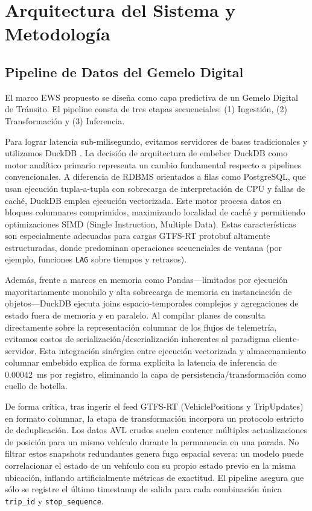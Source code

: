 \documentclass[journal,twocolumn]{IEEEtran}
\begin{document}
\section{Arquitectura del Sistema y Metodología}

\subsection{Pipeline de Datos del Gemelo Digital}
El marco EWS propuesto se diseña como capa predictiva de un Gemelo Digital de Tránsito. El pipeline consta de tres etapas secuenciales: (1) Ingestión, (2) Transformación y (3) Inferencia.

Para lograr latencia sub-milisegundo, evitamos servidores de bases tradicionales y utilizamos DuckDB \cite{14}. La decisión de arquitectura de embeber DuckDB como motor analítico primario representa un cambio fundamental respecto a pipelines convencionales. A diferencia de RDBMS orientados a filas como PostgreSQL, que usan ejecución tupla-a-tupla con sobrecarga de interpretación de CPU y fallas de caché, DuckDB emplea ejecución vectorizada. Este motor procesa datos en bloques columnares comprimidos, maximizando localidad de caché y permitiendo optimizaciones SIMD (Single Instruction, Multiple Data). Estas características son especialmente adecuadas para cargas GTFS-RT protobuf altamente estructuradas, donde predominan operaciones secuenciales de ventana (por ejemplo, funciones \texttt{LAG} sobre tiempos y retrasos).

Además, frente a marcos en memoria como Pandas---limitados por ejecución mayoritariamente monohilo y alta sobrecarga de memoria en instanciación de objetos---DuckDB ejecuta joins espacio-temporales complejos y agregaciones de estado fuera de memoria y en paralelo. Al compilar planes de consulta directamente sobre la representación columnar de los flujos de telemetría, evitamos costos de serialización/deserialización inherentes al paradigma cliente-servidor. Esta integración sinérgica entre ejecución vectorizada y almacenamiento columnar embebido explica de forma explícita la latencia de inferencia de \SI{0.00042}{\ms} por registro, eliminando la capa de persistencia/transformación como cuello de botella.

De forma crítica, tras ingerir el feed GTFS-RT (VehiclePositions y TripUpdates) en formato columnar, la etapa de transformación incorpora un protocolo estricto de deduplicación. Los datos AVL crudos suelen contener múltiples actualizaciones de posición para un mismo vehículo durante la permanencia en una parada. No filtrar estos snapshots redundantes genera fuga espacial severa: un modelo puede correlacionar el estado de un vehículo con su propio estado previo en la misma ubicación, inflando artificialmente métricas de exactitud. El pipeline asegura que sólo se registre el último timestamp de salida para cada combinación única \texttt{trip\_id} y \texttt{stop\_sequence}.
\end{document}
